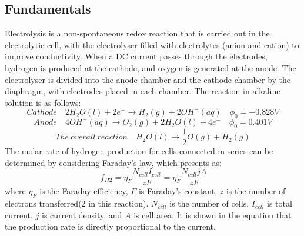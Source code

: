 \documentclass[11pt, a4paper]{article}
\begin{document}
\subsection{Fundamentals} 
Electrolysis is a non-spontaneous redox reaction that is carried out in the electrolytic cell, with the electrolyser filled with electrolytes (anion and cation) to improve conductivity. When a DC current passes through the electrodes, hydrogen is produced at the cathode, and oxygen is generated at the anode. The electrolyser is divided into the anode chamber and the cathode chamber by the diaphragm, with electrodes placed in each chamber. The reaction in alkaline solution is as follows:
\begin{equation} 
Cathode \quad 2H_2 O(l) + 2e^- \rightarrow H_2(g) + 2OH^-(aq)\quad   \phi_0=-0.828V
\end{equation} 
\begin{equation} 
Anode \quad 4OH^-(aq) \rightarrow O_2(g) +2H_2O(l) +4e^- \quad \phi_0=0.401V
\end{equation} 
\begin{equation} 
The \ overall \ reaction \quad H_2O(l) \rightarrow \frac{1}{2} O(g) + H_2(g) 
\end{equation} 
The molar rate of hydrogen production for cells connected in series can be determined by considering Faraday's law, which presents as:\cite{gibbs} 
\begin{equation} 
\ f_{H2} = \eta_F \frac{N_{cell}I_{cell}}{zF} =\eta_F\frac{N_{cell} jA}{zF} 
\end{equation} 
where $\eta_F$ is the Faraday efficiency, $F$ is Faraday's constant, $z$ is the number of electrons transferred(2 in this reaction). $N_{cell}$ is the number of cells, $I_{cell}$ is total current, $j$ is current density, and $A$ is cell area. It is shown in the equation that the production rate is directly proportional to the current.
\end{document}

